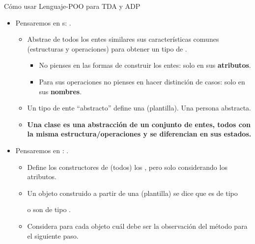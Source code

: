 \documentclass[10pt,envcountsect,spanish]{beamer}
\begin{document}
\begin{frame}{Cómo usar Lenguaje-POO para TDA y ADP} 

\begin{itemize}

\item Pensaremos en s: .
\begin{itemize}
\item 
Abstrae de todos los entes similares sus características comunes (estructuras y operaciones) para obtener un tipo de .

\begin{itemize}
\item No pienses en las formas de construir los entes: solo en sus \textbf{atributos}.
\item Para sus operaciones no pienses en hacer distinción de casos: solo en sus \textbf{nombres}.
\end{itemize}

\item  Un tipo de ente ``abstracto'' define una  (plantilla).
\unEjemplo Una persona abstracta.

\item 
{} \textbf{Una clase es una abstracción de un conjunto de entes, todos con la misma estructura/operaciones y se diferencian en sus estados.}
\end{itemize}


\item  Pensaremos en : . 

\begin{itemize}
\item Define los constructores de (todos) los , pero solo considerando los atributos.

\item Un objeto construido a partir de una  (plantilla) se dice que es de tipo 

\unEjemplo \small  {} o  son de tipo  .

\item Considera para cada objeto cuál debe ser la observación del método para el siguiente paso.
\end{itemize}


\end{itemize}
\end{frame}
\end{document}
